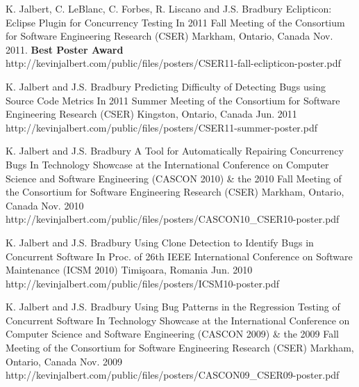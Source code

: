   \posterEntry
    {K. Jalbert, C. LeBlanc, C. Forbes, R. Liscano and J.S. Bradbury}
    {Eclipticon: Eclipse Plugin for Concurrency Testing}
    {In 2011 Fall Meeting of the Consortium for Software Engineering Research (CSER)}
    {Markham, Ontario, Canada}
    {Nov. 2011. \textbf{Best Poster Award}}
    {http://kevinjalbert.com/public/files/posters/CSER11-fall-eclipticon-poster.pdf}

  \posterEntry
    {K. Jalbert and J.S. Bradbury}
    {Predicting Difficulty of Detecting Bugs using Source Code Metrics}
    {In 2011 Summer Meeting of the Consortium for Software Engineering Research (CSER)}
    {Kingston, Ontario, Canada}
    {Jun. 2011}
    {http://kevinjalbert.com/public/files/posters/CSER11-summer-poster.pdf}

  \posterEntry
    {K. Jalbert and J.S. Bradbury}
    {A Tool for Automatically Repairing Concurrency Bugs}
    {In Technology Showcase at the International Conference on Computer Science and Software Engineering (CASCON 2010) \& the 2010 Fall Meeting of the Consortium for Software Engineering Research (CSER)}
    {Markham, Ontario, Canada}
    {Nov. 2010}
    {http://kevinjalbert.com/public/files/posters/CASCON10_CSER10-poster.pdf}

  \posterEntry
    {K. Jalbert and J.S. Bradbury}
    {Using Clone Detection to Identify Bugs in Concurrent Software}
    {In Proc. of 26th IEEE International Conference on Software Maintenance (ICSM 2010)}
    {Timi\c{s}oara, Romania}
    {Jun. 2010}
    {http://kevinjalbert.com/public/files/posters/ICSM10-poster.pdf}

  \posterEntry
    {K. Jalbert and J.S. Bradbury}
    {Using Bug Patterns in the Regression Testing of Concurrent Software}
    {In Technology Showcase at the International Conference on Computer Science and Software Engineering (CASCON 2009) \& the 2009 Fall Meeting of the Consortium for Software Engineering Research (CSER)}
    {Markham, Ontario, Canada}
    {Nov. 2009}
    {http://kevinjalbert.com/public/files/posters/CASCON09_CSER09-poster.pdf}


